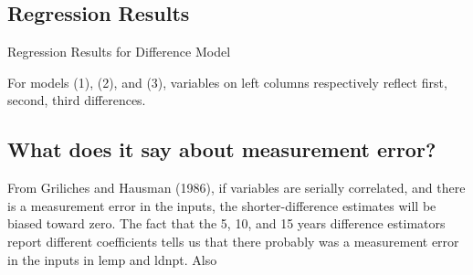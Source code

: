\subsection{Regression Results}

\begin{table}[h]
    \centering
    \small
    
    \caption{Regression Results for Difference Model}
    \label{tab:my_label}
\end{table}

For models (1), (2), and (3), variables on left columns respectively reflect first, second, third differences.

\subsection{What does it say about measurement error?}
From Griliches and Hausman (1986), if variables are serially correlated, and there is a measurement error in the inputs, the shorter-difference estimates will be biased toward zero. The fact that the 5, 10, and 15 years difference estimators report different coefficients tells us that there probably was a measurement error in the inputs in lemp and ldnpt. Also